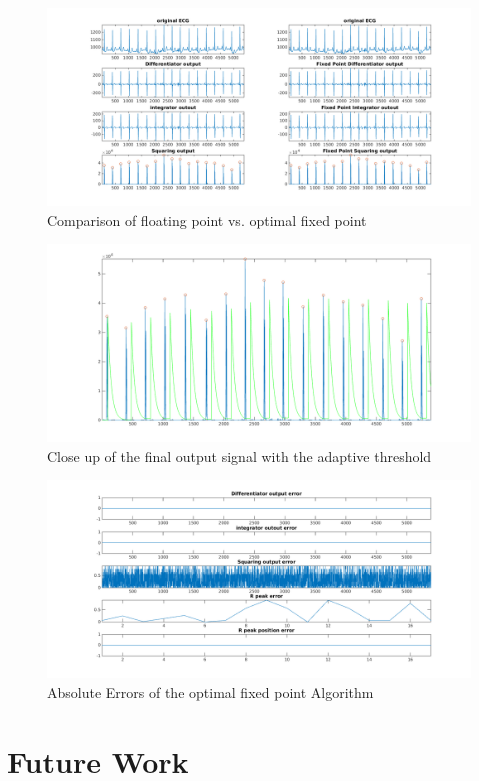 \documentclass{article}
\begin{document}
\begin{figure}%
        \centering
        \centerline{\includegraphics[scale=0.6]{./figs/comparison.png}}
        \caption{Comparison of floating point vs. optimal fixed point}
        \label{fig:rivas}
\end{figure}

\begin{figure}%
        \centerline{\includegraphics[scale=0.4]{./figs/rivas_closeup.png}}
        \caption{Close up of the final output signal with the adaptive threshold}
        \label{fig:rivasclose}
\end{figure}

\begin{figure}%
        \centerline{\includegraphics[scale=0.6]{./figs/fxpt_errors1.png}}
        \caption{Absolute Errors of the optimal fixed point Algorithm}
        \label{fig:errors}
\end{figure}

\section{Future Work} %

\newpage 



\end{document}
